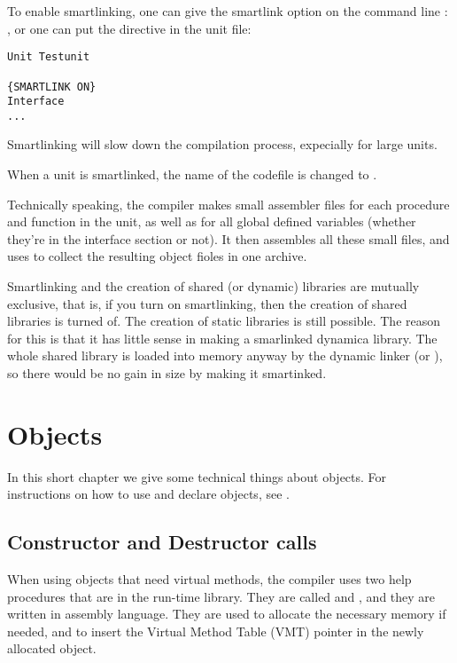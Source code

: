 \documentclass{report}
\begin{document}
To enable smartlinking, one can give the smartlink option on the command
line : , or one can put the  directive in
the unit file:
\begin{verbatim}
Unit Testunit

{SMARTLINK ON}
Interface
... 
\end{verbatim}
Smartlinking will slow down the compilation process, expecially for large
units.

When a unit  is smartlinked, the name of the codefile is 
changed to .

Technically speaking, the compiler makes small assembler files for each
procedure and function in the unit, as well as for all global defined
variables (whether they're in the interface section or not). It then
assembles all these small files, and uses  to collect the resulting
object fioles in one archive.

Smartlinking and the creation of shared (or dynamic) libraries are mutually
exclusive, that is, if you turn on smartlinking, then the creation of shared
libraries is turned of. The creation of static libraries is still possible.
The reason for this is that it has little sense in making a smarlinked
dynamica library. The whole shared library is loaded into memory anyway by
the dynamic linker (or \windowsnt), so there would be no gain in size by 
making it smartinked.

\chapter{Objects}
\label{ch:Objects}
In this short chapter we give some technical things about objects. For
instructions on how to use and declare objects, see .

\section{Constructor and Destructor calls}
\label{se:ConsDest}
When using objects that need virtual methods, the compiler uses two help
procedures that are in the run-time library. They are called
 and , and they are written in
assembly language. They are used to allocate the necessary memory if needed,
and to insert the Virtual Method Table (VMT) pointer in the newly allocated
object.
\end{document}
